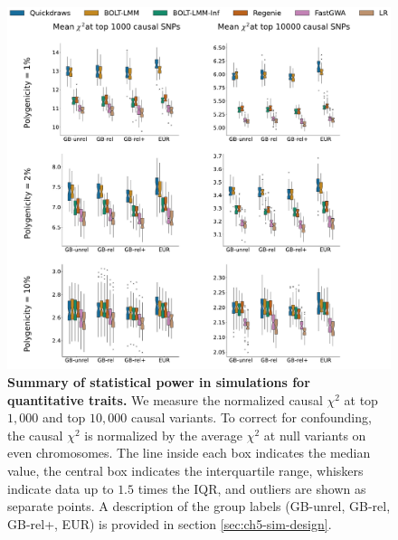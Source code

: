 \begin{figure}[h!]
    \centering
    \includegraphics[width=\textwidth]{figures/sim_power/qt_power.pdf}
    
    \caption{\textbf{Summary of statistical power in simulations for quantitative traits.}
    We measure the normalized causal $\chi^2$ at top $1{,}000$ and top $10{,}000$ causal variants.
    To correct for confounding, the causal $\chi^2$ is normalized by the average $\chi^2$ at null variants on even chromosomes.
    The line inside each box indicates the median value, the central box indicates the interquartile range, whiskers indicate data up to $1.5$ times the IQR, and outliers are shown as separate points.
    A description of the group labels (GB-unrel, GB-rel, GB-rel+, EUR) is provided in section \ref{sec:ch5-sim-design}.
    \label{fig:sim_power_qt}
    }
\end{figure}

